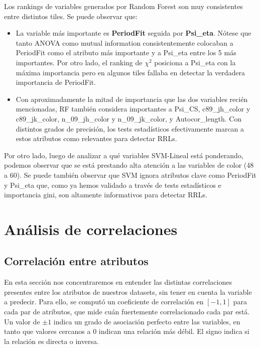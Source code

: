 Los rankings de variables generados por Random Forest son muy consistentes entre distintos tiles. Se puede observar que:

\begin{itemize}
\item La variable más importante es \textbf{PeriodFit} seguida por \textbf{Psi\_eta}. Nótese que tanto ANOVA como mutual information consistentemente colocaban a PeriodFit como el atributo más importante y a Psi\_eta entre los 5 más importantes. Por otro lado, el ranking de $\chi^2$ posiciona a Psi\_eta con la máxima importancia pero en algunos tiles fallaba en detectar la verdadera importancia de PeriodFit.
\item Con aproximadamente la mitad de importancia que las dos variables recién mencionadas, RF también considera importantes a Psi\_CS, c89\_jh\_color y c89\_jk\_color, n\_09\_jh\_color y n\_09\_jk\_color, y Autocor\_length. Con distintos grados de precisión, los tests estadísticos efectivamente marcan a estos atributos como relevantes para detectar RRLs.
\end{itemize}

Por otro lado, luego de analizar a qué variables SVM-Lineal está ponderando, podemos observar que se está prestando alta atención a las variables de color (48 a 60). Se puede también observar que SVM ignora atributos clave como PeriodFit y Psi\_eta que, como ya hemos validado a través de tests estadísticos e importancia gini, son altamente informativos para detectar RRLs. \\

\section{ Análisis de correlaciones }

\subsection{ Correlación entre atributos }

En esta sección nos concentraremos en entender las distintas correlaciones presentes entre los atributos de nuestros datasets, sin tener en cuenta la variable a predecir. Para ello, se computó un coeficiente de correlación en $[-1,1]$ para cada par de atributos, que mide cuán fuertemente correlacionado cada par está. Un valor de $\pm 1$ indica un grado de asociación perfecto entre las variables, en tanto que valores cercanos a $0$ indican una relación más débil. El signo indica si la relación es directa o inversa.  \\

